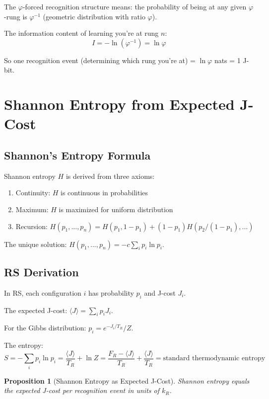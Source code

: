 \documentclass[12pt,a4paper]{article}
\newtheorem{proposition}[theorem]{Proposition}
\theoremstyle{definition}
\theoremstyle{remark}
\begin{document}
The $\varphi$-forced recognition structure means: the probability of being at 
any given $\varphi$-rung is $\varphi^{-1}$ (geometric distribution with ratio $\varphi$).

The information content of learning you're at rung $n$:
\begin{equation}
I = -\ln(\varphi^{-1}) = \ln\varphi
\end{equation}

So one recognition event (determining which rung you're at) = $\ln\varphi$ nats = 1 J-bit.

\section{Shannon Entropy from Expected J-Cost}

\subsection{Shannon's Entropy Formula}

Shannon entropy $H$ is derived from three axioms:
\begin{enumerate}
\item Continuity: $H$ is continuous in probabilities
\item Maximum: $H$ is maximized for uniform distribution
\item Recursion: $H(p_1, ..., p_n) = H(p_1, 1-p_1) + (1-p_1) H(p_2/(1-p_1), ...)$
\end{enumerate}

The unique solution: $H(p_1, ..., p_n) = -c \sum_i p_i \ln p_i$.

\subsection{RS Derivation}

In RS, each configuration $i$ has probability $p_i$ and J-cost $J_i$.

The expected J-cost: $\langle J \rangle = \sum_i p_i J_i$.

For the Gibbs distribution: $p_i = e^{-J_i/T_R} / Z$.

The entropy:
\begin{equation}
S = -\sum_i p_i \ln p_i = \frac{\langle J \rangle}{T_R} + \ln Z = \frac{F_R - \langle J \rangle}{T_R} + \frac{\langle J \rangle}{T_R} = \text{standard thermodynamic entropy}
\end{equation}

\begin{proposition}[Shannon Entropy as Expected J-Cost]
Shannon entropy equals the expected J-cost per recognition event in units of $k_R$.
\end{proposition}
\end{document}
